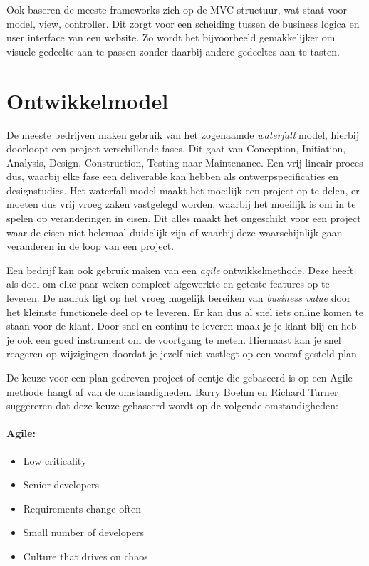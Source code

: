 \documentclass[12pt, a4paper]{article}
\begin{document}
Ook baseren de meeste frameworks zich op de MVC structuur, wat staat voor model, view, controller. Dit zorgt voor een scheiding tussen de business logica en user interface van een website. Zo wordt het bijvoorbeeld gemakkelijker om visuele gedeelte aan te passen zonder daarbij andere gedeeltes aan te tasten.

\section{Ontwikkelmodel}

De meeste bedrijven maken gebruik van het zogenaamde \emph{waterfall} model, hierbij doorloopt een project verschillende fases. Dit gaat van Conception, Initiation, Analysis, Design, Construction, Testing naar Maintenance. Een vrij lineair proces dus, waarbij elke fase een deliverable kan hebben als ontwerpspecificaties en designstudies. Het waterfall model maakt het moeilijk een project op te delen, er moeten dus vrij vroeg zaken vastgelegd worden, waarbij het moeilijk is om in te spelen op veranderingen in eisen. Dit alles maakt het ongeschikt voor een project waar de eisen niet helemaal duidelijk zijn of waarbij deze waarschijnlijk gaan veranderen in de loop van een project.

Een bedrijf kan ook gebruik maken van een \emph{agile} ontwikkelmethode. Deze heeft als doel om elke paar weken compleet afgewerkte en geteste features op te leveren. De nadruk ligt op het vroeg mogelijk bereiken van \emph{business value} door het kleinste functionele deel op te leveren. Er kan dus al snel iets online komen te staan voor de klant. Door snel en continu te leveren maak je je klant blij en heb je ook een goed instrument om de voortgang te meten. Hiernaast kan je snel reageren op wijzigingen doordat je jezelf niet vastlegt op een vooraf gesteld plan.

De keuze voor een plan gedreven project of eentje die gebaseerd is op een Agile methode hangt af van de omstandigheden. Barry Boehm en Richard Turner\cite{agilebook} suggereren dat deze keuze gebaseerd wordt op de volgende omstandigheden:

\paragraph{Agile:}
\begin{itemize}
  \item Low criticality
  \item Senior developers
  \item Requirements change often
  \item Small number of developers
  \item Culture that drives on chaos
\end{itemize}
\end{document}
